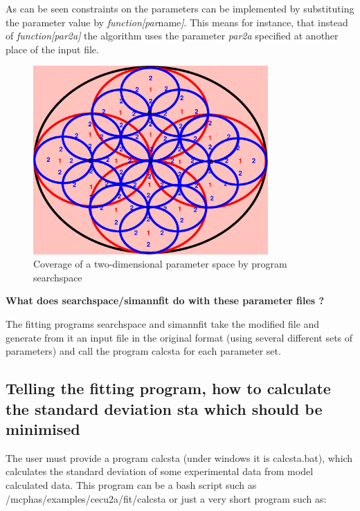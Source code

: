 As can be seen constraints on the parameters can be implemented by
substituting the parameter value by {\em function[par}name{\em ]}.
This means for instance, that instead of {\em function[par2a]} the algorithm
uses the parameter {\em par2a} specified at another place of the input file.

\begin{figure}[hb]%
\begin{center}\leavevmode
\includegraphics[angle=0, width=0.8\textwidth]{figsrc/searchspace.eps}
\end{center}\label{searchspace}
\caption{Coverage of a two-dimensional parameter space by program {\prg searchspace}}
\end{figure}

{\bf What does searchspace/simannfit do with these parameter files ?}

The fitting programs {\prg searchspace} and 
{\prg simannfit} take the modified file and generate from it an
input file in the original format (using several different
sets of parameters) and call the program
{\prg calcsta} for each parameter set.

\subsection{Telling the fitting program, how to calculate the standard deviation {\prg sta} which should be minimised}


The user must provide a program {\prg calcsta}  (under windows 
it is {\prg calcsta.bat}), which calculates the standard deviation
of some experimental data from model calculated data. This program can
be a bash script such as {\prg /mcphas/examples/cecu2a/fit/calcsta} or just a
very short program such as:


